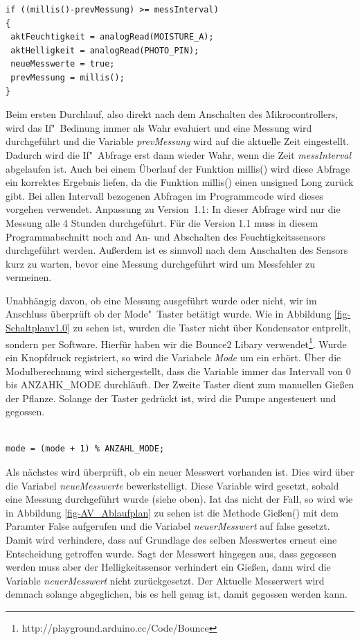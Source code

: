 \begin{lstlisting}[basicstyle=\small]
if ((millis()-prevMessung) >= messInterval)
{
 aktFeuchtigkeit = analogRead(MOISTURE_A);
 aktHelligkeit = analogRead(PHOTO_PIN);
 neueMesswerte = true; 
 prevMessung = millis();
}
\end{lstlisting}

Beim ersten Durchlauf, also direkt nach dem Anschalten des Mikrocontrollers, wird das If"~Bedinung immer als Wahr evaluiert und eine Messung wird durchgeführt und die Variable \emph{prevMessung} wird auf die aktuelle Zeit eingestellt. Dadurch wird die If"~Abfrage erst dann wieder Wahr, wenn die Zeit \emph{messInterval} abgelaufen ist. Auch bei einem Überlauf der Funktion millis() wird diese Abfrage ein korrektes Ergebnis liefen, da die Funktion millis() einen unsigned Long zurück gibt. Bei allen Intervall bezogenen Abfragen im Programmcode wird dieses vorgehen verwendet. 
Anpassung zu Version~1.1: In dieser Abfrage wird nur die Messung alle 4 Stunden durchgeführt. Für die Version 1.1 muss in diesem Programmabschnitt noch and An- und Abschalten des Feuchtigkeitssensors durchgeführt werden. Außerdem ist es sinnvoll nach dem Anschalten des Sensors kurz zu warten, bevor eine Messung durchgeführt wird um Messfehler zu vermeinen.

Unabhängig davon, ob eine Messung ausgeführt wurde oder nicht, wir im Anschluss überprüft ob der Mode"~Taster betätigt wurde. Wie in Abbildung \ref{fig-Schaltplanv1.0} zu sehen ist, wurden die Taster nicht über Kondensator entprellt, sondern per Software. Hierfür haben wir die Bounce2 Libary verwendet\footnote{http://playground.arduino.cc/Code/Bounce}. Wurde ein Knopfdruck registriert, so wird die Variabele \emph{Mode} um ein erhört. Über die Modulberechnung wird sichergestellt, dass die Variable immer das Intervall von 0 bis ANZAHK\_MODE durchläuft. Der Zweite Taster dient zum manuellen Gießen der Pflanze. Solange der Taster gedrückt ist, wird die Pumpe angesteuert und gegossen. 

\begin{lstlisting}[basicstyle=\small]

mode = (mode + 1) % ANZAHL_MODE;

\end{lstlisting}

Als nächstes wird überprüft, ob ein neuer Messwert vorhanden ist. Dies wird über die Variabel \emph{neueMesswerte} bewerkstelligt. Diese Variable wird gesetzt, sobald eine Messung durchgeführt wurde (siehe oben). Iat das nicht der Fall, so wird wie in Abbildung \ref{fig-AV_Ablaufplan} zu sehen ist die Methode Gießen() mit dem Paramter False aufgerufen und die Variabel \emph{neuerMesswert} auf false gesetzt. Damit wird verhindere, dass auf Grundlage des selben Messwertes erneut eine Entscheidung getroffen wurde. Sagt der Messwert hingegen aus, dass gegossen werden muss aber der Helligkeitssensor verhindert ein Gießen, dann wird die Variable \emph{neuerMesswert} nicht zurückgesetzt. Der Aktuelle Messerwert wird demnach solange abgeglichen, bis es hell genug ist, damit gegossen werden kann.

